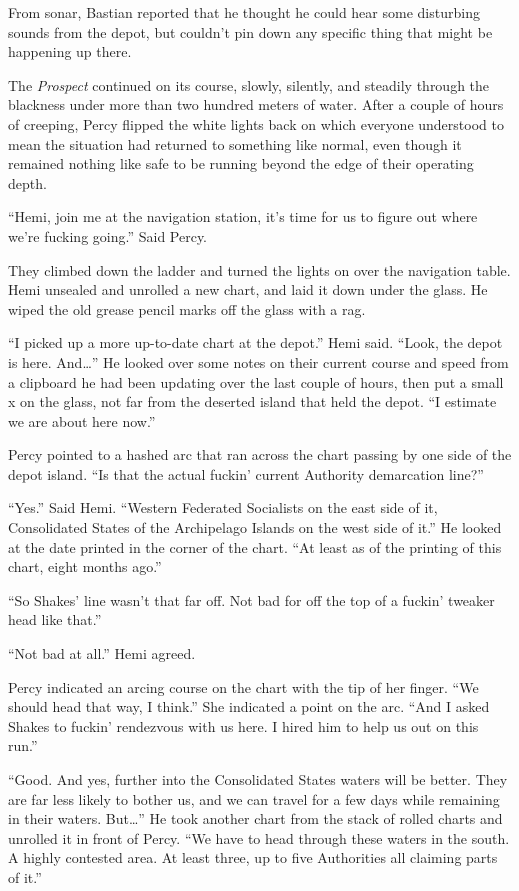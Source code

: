 \documentclass[]{scrbook}
\begin{document}
From sonar, Bastian reported that he thought he could hear some
disturbing sounds from the depot, but couldn't pin down any specific
thing that might be happening up there.

The \emph{Prospect} continued on its course, slowly, silently, and
steadily through the blackness under more than two hundred meters of
water. After a couple of hours of creeping, Percy flipped the white
lights back on which everyone understood to mean the situation had
returned to something like normal, even though it remained nothing like
safe to be running beyond the edge of their operating depth.

``Hemi, join me at the navigation station, it's time for us to figure
out where we're fucking going.'' Said Percy.

They climbed down the ladder and turned the lights on over the
navigation table. Hemi unsealed and unrolled a new chart, and laid it
down under the glass. He wiped the old grease pencil marks off the glass
with a rag.

``I picked up a more up-to-date chart at the depot.'' Hemi said. ``Look,
the depot is here. And\ldots{}'' He looked over some notes on their
current course and speed from a clipboard he had been updating over the
last couple of hours, then put a small x on the glass, not far from the
deserted island that held the depot. ``I estimate we are about here
now.''

Percy pointed to a hashed arc that ran across the chart passing by one
side of the depot island. ``Is that the actual fuckin' current Authority
demarcation line?''

``Yes.'' Said Hemi. ``Western Federated Socialists on the east side of
it, Consolidated States of the Archipelago Islands on the west side of
it.'' He looked at the date printed in the corner of the chart. ``At
least as of the printing of this chart, eight months ago.''

``So Shakes' line wasn't that far off. Not bad for off the top of a
fuckin' tweaker head like that.''

``Not bad at all.'' Hemi agreed.

Percy indicated an arcing course on the chart with the tip of her
finger. ``We should head that way, I think.'' She indicated a point on
the arc. ``And I asked Shakes to fuckin' rendezvous with us here. I
hired him to help us out on this run.''

``Good. And yes, further into the Consolidated States waters will be
better. They are far less likely to bother us, and we can travel for a
few days while remaining in their waters. But\ldots{}'' He took another
chart from the stack of rolled charts and unrolled it in front of Percy.
``We have to head through these waters in the south. A highly contested
area. At least three, up to five Authorities all claiming parts of it.''
\end{document}
